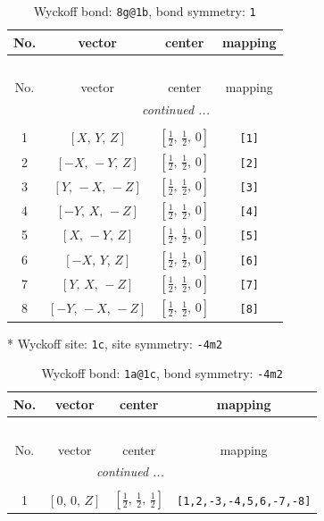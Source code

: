 \documentclass[fleqn,8pt]{jsarticle}
\begin{document}
\begin{longtable}{cccc}
\caption{Wyckoff bond: {\tt 8g@1b}, bond symmetry: {\tt 1}}
 \\
 \hline \hline
No. & vector & center & mapping \\ \hline \endfirsthead

\multicolumn{3}{l}{\tablename\ \thetable{}} \\
 \hline \hline
No. & vector & center & mapping \\ \hline \endhead

 \hline \hline
\multicolumn{3}{r}{\footnotesize\it continued ...} \\ \endfoot

 \hline \hline
\multicolumn{3}{r}{} \\ \endlastfoot

1 & $\left[ X,\, Y,\, Z \right]$ & $\left[ \frac{1}{2},\, \frac{1}{2},\, 0 \right]$ & {\tt [1]} \\ \hline
2 & $\left[ - X,\, - Y,\, Z \right]$ & $\left[ \frac{1}{2},\, \frac{1}{2},\, 0 \right]$ & {\tt [2]} \\ \hline
3 & $\left[ Y,\, - X,\, - Z \right]$ & $\left[ \frac{1}{2},\, \frac{1}{2},\, 0 \right]$ & {\tt [3]} \\ \hline
4 & $\left[ - Y,\, X,\, - Z \right]$ & $\left[ \frac{1}{2},\, \frac{1}{2},\, 0 \right]$ & {\tt [4]} \\ \hline
5 & $\left[ X,\, - Y,\, Z \right]$ & $\left[ \frac{1}{2},\, \frac{1}{2},\, 0 \right]$ & {\tt [5]} \\ \hline
6 & $\left[ - X,\, Y,\, Z \right]$ & $\left[ \frac{1}{2},\, \frac{1}{2},\, 0 \right]$ & {\tt [6]} \\ \hline
7 & $\left[ Y,\, X,\, - Z \right]$ & $\left[ \frac{1}{2},\, \frac{1}{2},\, 0 \right]$ & {\tt [7]} \\ \hline
8 & $\left[ - Y,\, - X,\, - Z \right]$ & $\left[ \frac{1}{2},\, \frac{1}{2},\, 0 \right]$ & {\tt [8]} \\
\end{longtable}
* Wyckoff site: {\tt 1c}, site symmetry: {\tt -4m2}
\renewcommand{\arraystretch}{1.2}
\begin{longtable}{cccc}
\caption{Wyckoff bond: {\tt 1a@1c}, bond symmetry: {\tt -4m2}}
 \\
 \hline \hline
No. & vector & center & mapping \\ \hline \endfirsthead

\multicolumn{3}{l}{\tablename\ \thetable{}} \\
 \hline \hline
No. & vector & center & mapping \\ \hline \endhead

 \hline \hline
\multicolumn{3}{r}{\footnotesize\it continued ...} \\ \endfoot

 \hline \hline
\multicolumn{3}{r}{} \\ \endlastfoot

1 & $\left[ 0,\, 0,\, Z \right]$ & $\left[ \frac{1}{2},\, \frac{1}{2},\, \frac{1}{2} \right]$ & {\tt [1,2,-3,-4,5,6,-7,-8]} \\
\end{longtable}
\end{document}
